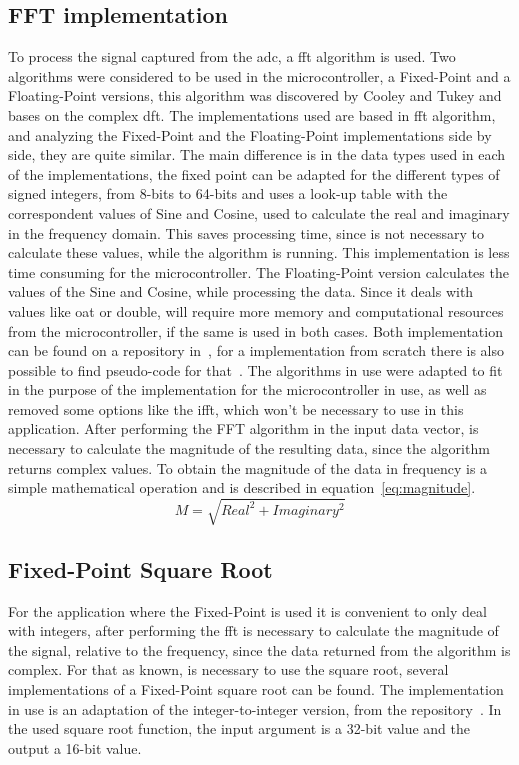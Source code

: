 \subsection{FFT implementation}\label{subsec:fftImp}
To process the signal captured from the \acrshort{adc}, a \acrshort{fft} algorithm is used. Two algorithms were considered to be used in the microcontroller, a Fixed-Point and a Floating-Point versions, this algorithm was discovered by Cooley and Tukey and bases on the complex \acrshort{dft}. 
The implementations used are based in \acrshort{fft} algorithm, and analyzing the Fixed-Point and the Floating-Point implementations side by side, they are quite similar. The main difference is in the data types used in each of the implementations, the fixed point can be adapted for the different types of signed integers, from 8-bits to 64-bits and uses a look-up table with the correspondent values of Sine and Cosine, used to calculate the real and imaginary in the frequency domain. This saves processing time, since is not necessary to calculate these values, while the algorithm is running. This implementation is less time consuming for the microcontroller. The Floating-Point version calculates the values of the Sine and Cosine, while processing the data. Since it deals with values like oat or double, will require more memory and computational resources from the microcontroller, if the same is used in both cases. Both implementation can be found on a repository in~\cite{262588213843476FixFft,Dannyf00FloatingPointFFTBenchmarka}, for a implementation from scratch there is also possible to find pseudo-code for that~\cite{smith1997scientist}.
The algorithms in use were adapted to fit in the purpose of the implementation for the microcontroller in use, as well as removed some options like the \acrshort{ifft}, which won't be necessary to use in this application.
After performing the FFT algorithm in the input data vector, is necessary to calculate the magnitude of the resulting data, since the algorithm returns complex values. To obtain the magnitude of the data in frequency is a simple mathematical operation and is described in equation~\ref{eq:magnitude}.
\begin{equation}\label{eq:magnitude}
    M = \sqrt{Real^2 + Imaginary^2}
\end{equation}
\subsection{Fixed-Point Square Root}
For the application where the Fixed-Point is used it is convenient to only deal with integers, after performing the \acrshort{fft} is necessary to calculate the magnitude of the signal, relative to the frequency, since the data returned from the algorithm is complex. For that as known, is necessary to use the square root, several implementations of a Fixed-Point square root can be found. The implementation in use is an adaptation of the integer-to-integer version, from the repository~\cite{ChmikeFpsqrta}. In the used square root function, the input argument is a 32-bit value and the output a 16-bit value. 
